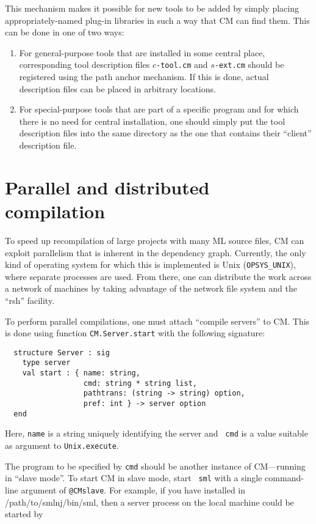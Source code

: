 \documentclass{article}
\begin{document}
This mechanism makes it possible for new tools to be added by simply
placing appropriately-named plug-in libraries in such a way that CM
can find them.  This can be done in one of two ways:

\begin{enumerate}
\item For general-purpose tools that are installed in some central
place, corresponding tool description files $c${\tt -tool.cm} and
$s${\tt -ext.cm} should be registered using the path anchor mechanism.
If this is done, actual description files can be placed in arbitrary
locations.
\item For special-purpose tools that are part of a specific program
and for which there is no need for central installation, one should
simply put the tool description files into the same directory as the
one that contains their ``client'' description file.
\end{enumerate}

\section{Parallel and distributed compilation}
\label{sec:parmake}

To speed up recompilation of large projects with many ML source files,
CM can exploit parallelism that is inherent in the dependency graph.
Currently, the only kind of operating system for which this is
implemented is Unix ({\tt OPSYS\_UNIX}), where separate processes are
used.  From there, one can distribute the work across a network of
machines by taking advantage of the network file system and the
``rsh'' facility.

To perform parallel compilations, one must attach ``compile servers'' to
CM.  This is done using function {\tt CM.Server.start} with the following
signature:

\begin{verbatim}
  structure Server : sig
    type server
    val start : { name: string,
                  cmd: string * string list,
                  pathtrans: (string -> string) option,
                  pref: int } -> server option
  end
\end{verbatim}

Here, {\tt name} is a string uniquely identifying the server and {\tt
cmd} is a value suitable as argument to {\tt Unix.execute}.

The program to be specified by {\tt cmd} should be another instance of
CM---running in ``slave mode''.  To start CM in slave mode, start {\tt
sml} with a single command-line argument of {\tt @CMslave}.  For
example, if you have installed in /path/to/smlnj/bin/sml, then a
server process on the local machine could be started by
\end{document}
